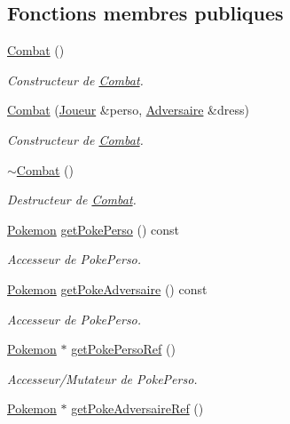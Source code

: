 \subsection*{Fonctions membres publiques}
\begin{DoxyCompactItemize}
\item 
\hyperlink{class_combat_a4c2dfed2f9da749ae341de25c7427f73}{Combat} ()
\begin{DoxyCompactList}\small\item\em Constructeur de \hyperlink{class_combat}{Combat}. \end{DoxyCompactList}\item 
\hyperlink{class_combat_af420be03c806ef847c0542ab0d7223f9}{Combat} (\hyperlink{class_joueur}{Joueur} \&perso, \hyperlink{class_adversaire}{Adversaire} \&dress)
\begin{DoxyCompactList}\small\item\em Constructeur de \hyperlink{class_combat}{Combat}. \end{DoxyCompactList}\item 
\hyperlink{class_combat_a044df77ec24b76ca8b1cc3dde0de5049}{$\sim$\+Combat} ()
\begin{DoxyCompactList}\small\item\em Destructeur de \hyperlink{class_combat}{Combat}. \end{DoxyCompactList}\item 
\hyperlink{class_pokemon}{Pokemon} \hyperlink{class_combat_a6f3c9e5df27cfb30359dcb0425a45f6d}{get\+Poke\+Perso} () const
\begin{DoxyCompactList}\small\item\em Accesseur de Poke\+Perso. \end{DoxyCompactList}\item 
\hyperlink{class_pokemon}{Pokemon} \hyperlink{class_combat_aa06e658e7fb4ab91174ba4d832588bae}{get\+Poke\+Adversaire} () const
\begin{DoxyCompactList}\small\item\em Accesseur de Poke\+Perso. \end{DoxyCompactList}\item 
\hyperlink{class_pokemon}{Pokemon} $\ast$ \hyperlink{class_combat_a9a44a83a9c1fe5d67f0b620dab547e56}{get\+Poke\+Perso\+Ref} ()
\begin{DoxyCompactList}\small\item\em Accesseur/\+Mutateur de Poke\+Perso. \end{DoxyCompactList}\item 
\hyperlink{class_pokemon}{Pokemon} $\ast$ \hyperlink{class_combat_a4f02e335d825eb98b64d5410a590b9f8}{get\+Poke\+Adversaire\+Ref} ()

\end{DoxyCompactItemize}
